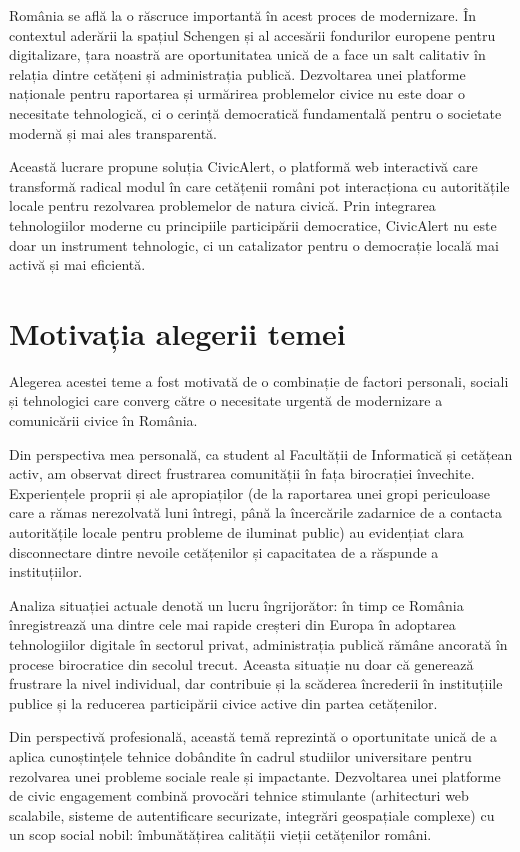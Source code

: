 \documentclass[12pt,a4paper]{report}
\begin{document}
România se află la o răscruce importantă în acest proces de modernizare. În contextul aderării la spațiul Schengen și al accesării fondurilor europene pentru digitalizare, țara noastră are oportunitatea unică de a face un salt calitativ în relația dintre cetățeni și administrația publică. Dezvoltarea unei platforme naționale pentru raportarea și urmărirea problemelor civice nu este doar o necesitate tehnologică, ci o cerință democratică fundamentală pentru o societate modernă și mai ales transparentă.

Această lucrare  propune soluția CivicAlert, o platformă web interactivă care transformă radical modul în care cetățenii români pot interacționa cu autoritățile locale pentru rezolvarea problemelor de natura civică. Prin integrarea tehnologiilor moderne cu principiile participării democratice, CivicAlert nu este doar un instrument tehnologic, ci un catalizator pentru o democrație locală mai activă și mai eficientă.
\section*{Motivația alegerii temei}

Alegerea acestei teme a fost motivată de o combinație de factori personali, sociali și tehnologici care converg către o necesitate urgentă de modernizare a comunicării civice în România.

Din perspectiva mea personală, ca student al Facultății de Informatică și cetățean activ, am observat direct frustrarea comunității în fața birocrației învechite. Experiențele proprii și ale apropiaților (de la raportarea unei gropi periculoase care a rămas nerezolvată luni întregi, până la încercările zadarnice de a contacta autoritățile locale pentru probleme de iluminat public) au evidențiat clara disconnectare dintre nevoile cetățenilor și capacitatea de a răspunde a instituțiilor.

Analiza situației actuale denotă un lucru îngrijorător: în timp ce România înregistrează una dintre cele mai rapide creșteri din Europa în adoptarea tehnologiilor digitale în sectorul privat, administrația publică rămâne ancorată în procese birocratice din secolul trecut. Aceasta situație nu doar că generează frustrare la nivel individual, dar contribuie și la scăderea încrederii în instituțiile publice și la reducerea participării civice active din partea cetățenilor.

Din perspectivă profesională, această temă reprezintă o oportunitate unică de a aplica cunoștințele tehnice dobândite în cadrul studiilor universitare pentru rezolvarea unei probleme sociale reale și impactante. Dezvoltarea unei platforme de civic engagement combină provocări tehnice stimulante (arhitecturi web scalabile, sisteme de autentificare securizate, integrări geospațiale complexe) cu un scop social nobil:  îmbunătățirea calității vieții cetățenilor români.
\end{document}
